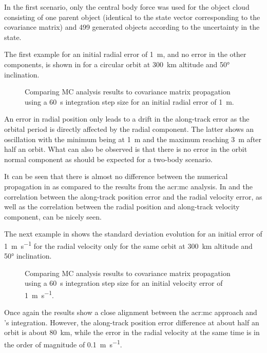 In the first scenario, only the central body force was used for the object cloud consisting of one parent object (identical to the state vector corresponding 
to the covariance matrix) and 499 generated objects according to the uncertainty in the state.

The first example for an initial radial error of \SI{1}{\metre}, and no error in the other components, is shown in  for a circular orbit at \SI{300}{\kilo\metre} altitude and \ang{50;;} inclination.
\begin{figure}[h!]
  \centering
  \hspace{1cm}
  \caption{Comparing MC analysis results to \neptune{} covariance matrix propagation using a \SI{60}{\second} integration step size for an initial radial error of \SI{1}{\metre}.\label{fig:val-cov-scen1-01}}
\end{figure}
An error in radial position only leads to a drift in the along-track error as the orbital period is directly affected by the radial component. The latter shows an oscillation with the minimum being at \SI{1}{\metre} and the maximum reaching \SI{3}{\metre} after half an orbit. What can also be observed is that there is no error in the 
orbit normal component as should be expected for a two-body scenario.

It can be seen that there is almost no difference between the numerical propagation in \neptune{} as compared to the results from the \gls{acr:mc} analysis. In  and  the correlation between the along-track position error and the radial velocity error, as well as the correlation between the radial position and along-track velocity component, can be nicely seen. 

The next example in  shows the standard deviation evolution for an initial error of \SI{1}{\metre\per\second} for the radial velocity only for the same orbit at \SI{300}{\kilo\metre} altitude and \ang{50;;} inclination. 
\begin{figure}[h!]
  \centering
  \hspace{1cm}
  \caption{Comparing MC analysis results to \neptune{} covariance matrix propagation using a \SI{60}{\second} integration step size for an initial velocity error of \SI{1}{\metre\per\second}.\label{fig:val-cov-scen1-02}}
\end{figure}
Once again the results show a close alignment between the \gls{acr:mc} approach and \neptune{}'s integration. However, the along-track position error difference at about half an orbit is about \SI{80}{\kilo\metre}, while the error in the radial velocity at the same time is in the order of magnitude of \SI{0.1}{\metre\per\second}. 

